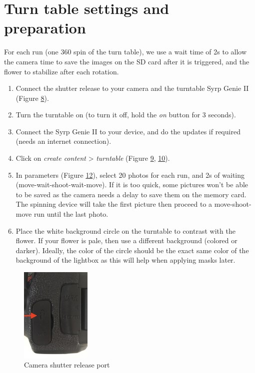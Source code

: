 \documentclass[
]{book}
\theoremstyle{definition}
\theoremstyle{definition}
\theoremstyle{definition}
\theoremstyle{definition}
\theoremstyle{remark}
\begin{document}
\hypertarget{turn-table-settings-and-preparation}{%
\section{Turn table settings and preparation}\label{turn-table-settings-and-preparation}}

For each run (one 360 spin of the turn table), we use a wait time of 2s
to allow the camera time to save the images on the SD card after it is
triggered, and the flower to stabilize after each rotation.

\begin{enumerate}
\def\labelenumi{\arabic{enumi}.}
\item
  Connect the shutter release to your camera and the turntable Syrp
  Genie II (Figure \protect\hyperlink{fig:shutter}{8}).
\item
  Turn the turntable on (to turn it off, hold the \emph{on} button for 3
  seconds).
\item
  Connect the Syrp Genie II to your device, and do the updates if
  required (needs an internet connection).
\item
  Click on \emph{create content} \textgreater{} \emph{turntable} (Figure
  \protect\hyperlink{genie_root}{9},
  \protect\hyperlink{genie_content}{10}).
\item
  In parameters (Figure \protect\hyperlink{record}{12}), select 20 photos for each run, and 2s of
  waiting (move-wait-shoot-wait-move). If it is too quick, some
  pictures won't be able to be saved as the camera needs a delay to
  save them on the memory card. The spinning device will take the
  first picture then proceed to a move-shoot-move run until the last
  photo.
\item
  Place the white background circle on the turntable to contrast with
  the flower. If your flower is pale, then use a different background
  (colored or darker). Ideally, the color of the circle should be the
  exact same color of the background of the lightbox as this will help
  when applying masks later.
\end{enumerate}

\begin{figure}
\hypertarget{fig:shutter}{%
\centering
\includegraphics[width=0.3\textwidth,height=\textheight]{Figures/shutter.jpg}
\caption{Camera shutter release port}\label{fig:shutter}
}
\end{figure}
\end{document}

